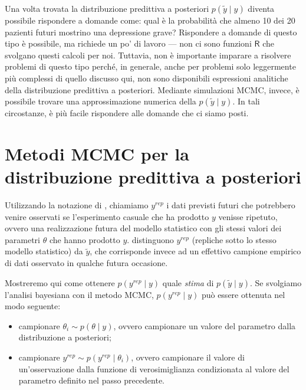 \documentclass[
  10pt,
  italian,
  a4paper,
  extrafontsizes,onecolumn,openright
  ]{memoir}
\providecommand{\tightlist}{%
  \setlength{\itemsep}{0pt}\setlength{\parskip}{0pt}}
\newcommand{\R}{\textsf{R}} %
\begin{document}
Una volta trovata la distribuzione predittiva a posteriori \(p(\tilde{y} \mid y)\) diventa possibile rispondere a domande come: qual è la probabilità che almeno 10 dei 20 pazienti futuri mostrino una depressione grave? Rispondere a domande di questo tipo è possibile, ma richiede un po' di lavoro --- non ci sono funzioni \(\R\) che svolgano questi calcoli per noi. Tuttavia, non è importante imparare a risolvere problemi di questo tipo perché, in generale, anche per problemi solo leggermente più complessi di quello discusso qui, non sono disponibili espressioni analitiche della distribuzione predittiva a posteriori. Mediante simulazioni MCMC, invece, è possibile trovare una approssimazione numerica della \(p(\tilde{y} \mid y)\). In tali circostanze, è più facile rispondere alle domande che ci siamo posti.

\hypertarget{metodi-mcmc-per-la-distribuzione-predittiva-a-posteriori}{%
\section{Metodi MCMC per la distribuzione predittiva a posteriori}\label{metodi-mcmc-per-la-distribuzione-predittiva-a-posteriori}}

Utilizzando la notazione di \textcite{gelman2014understanding}, chiamiamo \(y^{rep}\) i dati previsti futuri che potrebbero venire osservati se l'esperimento casuale che ha prodotto \(y\) venisse ripetuto, ovvero una realizzazione futura del modello statistico con gli stessi valori dei parametri \(\theta\) che hanno prodotto \(y\). \textcite{gelman2014understanding} distinguono \(y^{rep}\) (repliche sotto lo stesso modello statistico) da \(\tilde{y}\), che corrisponde invece ad un effettivo campione empirico di dati osservato in qualche futura occasione.

Mostreremo qui come ottenere \(p(y^{rep} \mid y)\) quale \emph{stima} di \(p(\tilde{y} \mid y)\). Se svolgiamo l'analisi bayesiana con il metodo MCMC, \(p(y^{rep} \mid y)\) può essere ottenuta nel modo seguente:

\begin{itemize}
\tightlist
\item
  campionare \(\theta_i \sim p(\theta \mid y)\), ovvero campionare un valore del parametro dalla distribuzione a posteriori;
\item
  campionare \(y^{rep} \sim p(y^{rep} \mid \theta_i)\), ovvero campionare il valore di un'osservazione dalla funzione di verosimiglianza condizionata al valore del parametro definito nel passo precedente.
\end{itemize}
\end{document}
